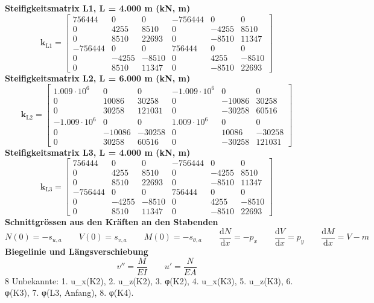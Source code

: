 \documentclass[11pt,a4paper]{article}
\begin{document}
\noindent\textbf{Steifigkeitsmatrix L1, L = 4.000 m (kN, m)}
\begin{equation*}
\mathbf{k}_{\text{L1}} = \begin{bmatrix} 756444 & 0 & 0 & -756444 & 0 & 0 \\ 0 & 4255 & 8510 & 0 & -4255 & 8510 \\ 0 & 8510 & 22693 & 0 & -8510 & 11347 \\ -756444 & 0 & 0 & 756444 & 0 & 0 \\ 0 & -4255 & -8510 & 0 & 4255 & -8510 \\ 0 & 8510 & 11347 & 0 & -8510 & 22693 \end{bmatrix}
\end{equation*}
\noindent\textbf{Steifigkeitsmatrix L2, L = 6.000 m (kN, m)}
\begin{equation*}
\mathbf{k}_{\text{L2}} = \begin{bmatrix} 1.009 \cdot 10^{6} & 0 & 0 & -1.009 \cdot 10^{6} & 0 & 0 \\ 0 & 10086 & 30258 & 0 & -10086 & 30258 \\ 0 & 30258 & 121031 & 0 & -30258 & 60516 \\ -1.009 \cdot 10^{6} & 0 & 0 & 1.009 \cdot 10^{6} & 0 & 0 \\ 0 & -10086 & -30258 & 0 & 10086 & -30258 \\ 0 & 30258 & 60516 & 0 & -30258 & 121031 \end{bmatrix}
\end{equation*}
\noindent\textbf{Steifigkeitsmatrix L3, L = 4.000 m (kN, m)}
\begin{equation*}
\mathbf{k}_{\text{L3}} = \begin{bmatrix} 756444 & 0 & 0 & -756444 & 0 & 0 \\ 0 & 4255 & 8510 & 0 & -4255 & 8510 \\ 0 & 8510 & 22693 & 0 & -8510 & 11347 \\ -756444 & 0 & 0 & 756444 & 0 & 0 \\ 0 & -4255 & -8510 & 0 & 4255 & -8510 \\ 0 & 8510 & 11347 & 0 & -8510 & 22693 \end{bmatrix}
\end{equation*}
\noindent\textbf{Schnittgrössen aus den Kräften an den Stabenden}
\begin{equation*}
N(0) = -s_{u,a} \qquad V(0) = s_{v,a} \qquad M(0) = -s_{\theta,a} \qquad \frac{\mathrm{d}N}{\mathrm{d}x} = -p_x \qquad \frac{\mathrm{d}V}{\mathrm{d}x} = p_y \qquad \frac{\mathrm{d}M}{\mathrm{d}x} = V - m
\end{equation*}
\noindent\textbf{Biegelinie und Längsverschiebung}
\begin{equation*}
v'' = \frac{M}{EI} \qquad u' = \frac{N}{EA}
\end{equation*}
8 Unbekannte: 1. u\_x(K2), 2. u\_z(K2), 3. φ(K2), 4. u\_x(K3), 5. u\_z(K3), 6. φ(K3), 7. φ(L3, Anfang), 8. φ(K4).
\end{document}
